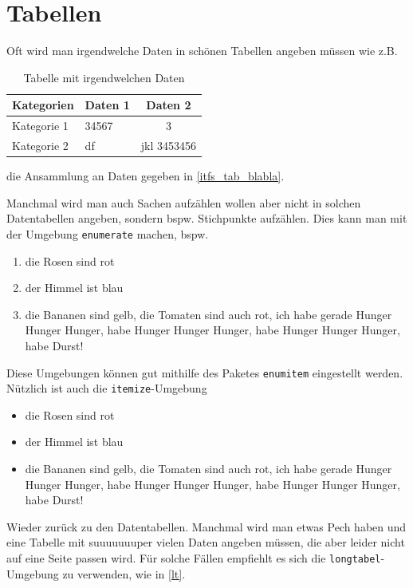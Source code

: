 \section{Tabellen}

Oft wird man irgendwelche Daten in schönen Tabellen angeben müssen wie z.B.

\begin{table}[!h]
	\centering
	\begin{tabular}{l|lc}
	\hline \hline
	Kategorien & Daten 1 & Daten 2 \\ \hline
	Kategorie 1 & 34567 & 3 \\
	Kategorie 2 & df & jkl 3453456 \\ \hline \hline
	\end{tabular}
	\caption{Tabelle mit irgendwelchen Daten}
	\label{itfs_tab_blabla}
\end{table}

die Ansammlung an Daten gegeben in \autoref{itfs_tab_blabla}. 

Manchmal wird man auch Sachen aufzählen wollen aber nicht in solchen Datentabellen angeben, sondern bspw. Stichpunkte aufzählen. Dies kann man mit der Umgebung \verb=enumerate= machen, bspw.
\begin{enumerate}[~~~a)]\itemsep=-2mm
	\item die Rosen sind rot
	\item der Himmel ist blau
	\item die Bananen sind gelb, die Tomaten sind auch rot, ich habe gerade Hunger Hunger Hunger, habe Hunger Hunger Hunger, habe Hunger Hunger Hunger, habe Durst!
\end{enumerate}
Diese Umgebungen können gut mithilfe des Paketes \verb=enumitem= eingestellt werden. Nützlich ist auch die \verb=itemize=-Umgebung
\begin{itemize}\itemsep=-1mm
	\item die Rosen sind rot
	\item der Himmel ist blau
	\item die Bananen sind gelb, die Tomaten sind auch rot, ich habe gerade Hunger Hunger Hunger, habe Hunger Hunger Hunger, habe Hunger Hunger Hunger, habe Durst!
\end{itemize}
Wieder zurück zu den Datentabellen. Manchmal wird man etwas Pech haben und eine Tabelle mit suuuuuuuper vielen Daten angeben müssen, die aber leider nicht auf eine Seite passen wird. Für solche Fällen empfiehlt es sich die \verb=longtabel=-Umgebung zu verwenden, wie in \autoref{lt}.

